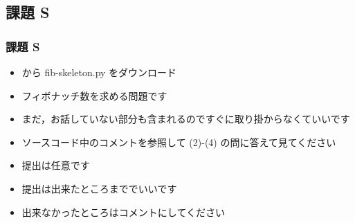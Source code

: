 %
%
\subsection{課題 S}
\begin{frame}[containsverbatim, shrink, label=quizS]
\frametitle{課題 S}
  \begin{itemize}
\item \href{https://sites.google.com/presystems.xyz/elementaryCS/}{} から fib-skeleton.py をダウンロード
\item フィボナッチ数を求める問題です
\item まだ，お話していない部分も含まれるのですぐに取り掛からなくていいです
\item ソースコード中のコメントを参照して (2)-(4) の問に答えて見てください
\item 提出は任意です
\item 提出は出来たところまででいいです
\item 出来なかったところはコメントにしてください
  \end{itemize}
\end{frame}
